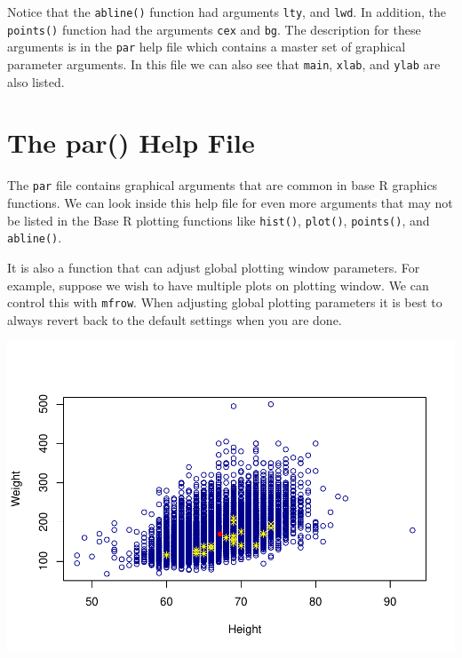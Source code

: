 \documentclass[
]{book}
\newenvironment{Shaded}{\begin{snugshade}}{\end{snugshade}}
\newcommand{\CommentTok}[1]{\textcolor[rgb]{0.56,0.35,0.01}{\textit{#1}}}
\newcommand{\DataTypeTok}[1]{\textcolor[rgb]{0.13,0.29,0.53}{#1}}
\newcommand{\DecValTok}[1]{\textcolor[rgb]{0.00,0.00,0.81}{#1}}
\newcommand{\KeywordTok}[1]{\textcolor[rgb]{0.13,0.29,0.53}{\textbf{#1}}}
\newcommand{\NormalTok}[1]{#1}
\newcommand{\OperatorTok}[1]{\textcolor[rgb]{0.81,0.36,0.00}{\textbf{#1}}}
\begin{document}
Notice that the \texttt{abline()} function had arguments \texttt{lty}, and \texttt{lwd}. In addition, the \texttt{points()} function had the arguments \texttt{cex} and \texttt{bg}. The description for these arguments is in the \texttt{par} help file which contains a master set of graphical parameter arguments. In this file we can also see that \texttt{main}, \texttt{xlab}, and \texttt{ylab} are also listed.

\hypertarget{the-par-help-file}{%
\section{The par() Help File}\label{the-par-help-file}}

The \texttt{par} file contains graphical arguments that are common in base R graphics functions. We can look inside this help file for even more arguments that may not be listed in the Base R plotting functions like \texttt{hist()}, \texttt{plot()}, \texttt{points()}, and \texttt{abline()}.

It is also a function that can adjust global plotting window parameters. For example, suppose we wish to have multiple plots on plotting window. We can control this with \texttt{mfrow}. When adjusting global plotting parameters it is best to always revert back to the default settings when you are done.

\begin{Shaded}
\end{Shaded}

\includegraphics{_main_files/figure-latex/unnamed-chunk-146-1.pdf}
\end{document}
